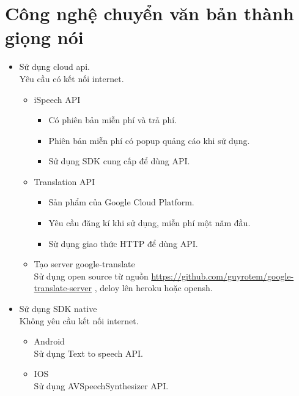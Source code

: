 \documentclass[a4paper,12pt,oneside]{article}
\begin{document}
\section{Công nghệ chuyển văn bản thành giọng nói}
	\begin{itemize}
		\item Sử dụng cloud api.\\
		Yêu cầu có kết nối internet.
			\begin{itemize}
				\item iSpeech API 
					\begin{itemize}
						\item Có phiên bản miễn phí và trả phí.
						\item Phiên bản miễn phí có popup quảng cáo khi sử dụng.
						\item Sử dụng SDK cung cấp để dùng API.
					\end{itemize}
				\item 	Translation API 
					\begin{itemize}
						\item Sản phẩm của Google Cloud Platform.
						\item Yêu cầu đăng kí khi sử dụng, miễn phí một năm đầu.
						\item Sừ dụng giao thức HTTP để dùng API.
					\end{itemize}
				\item Tạo server google-translate\\
				Sử dụng open source từ nguồn \href{url}{https://github.com/guyrotem/google- translate-server} , deloy lên heroku hoặc opensh.
			\end{itemize}
		\item Sử dụng SDK native\\
				Không yêu cầu kết nối internet.
				\begin{itemize}
					\item Android \\
						Sử dụng Text to speech API.
					\item IOS \\
						Sử dụng  AVSpeechSynthesizer API.
			\end{itemize}
	\end{itemize}
\end{document}
